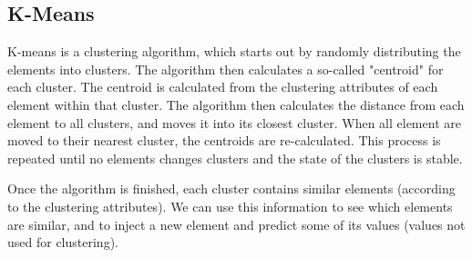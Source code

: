 \subsection{K-Means}
\label{Algo_KM}
K-means is a clustering algorithm, which starts out by randomly distributing the elements into clusters. The algorithm then calculates a so-called "centroid" for each cluster. The centroid is calculated from the clustering attributes of each element within that cluster. The algorithm then calculates the distance from each element to all clusters, and moves it into its closest cluster. When all element are moved to their nearest cluster, the centroids are re-calculated. This process is repeated until no elements changes clusters and the state of the clusters is stable.

Once the algorithm is finished, each cluster contains similar elements (according to the clustering attributes). We can use this information to see which elements are similar, and to inject a new element and predict some of its values (values not used for clustering).